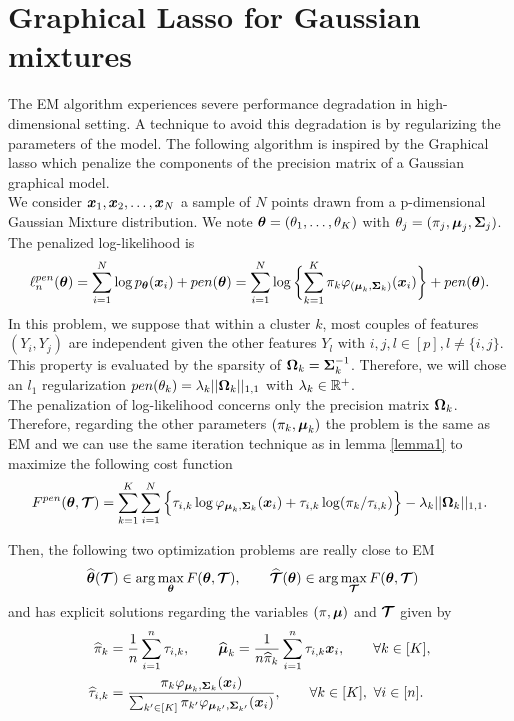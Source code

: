 \section{Graphical Lasso for Gaussian mixtures}

The EM algorithm experiences severe performance degradation in high-dimensional setting. A technique to avoid this degradation is by regularizing the parameters of the model. The following algorithm is inspired by the Graphical lasso \citep{glasso07} which penalize the components of the precision matrix of a Gaussian graphical model.\\

We consider $\boldsymbol x_1,\boldsymbol x_2,\dots,\boldsymbol x_N$ a sample of $N$ points drawn from a p-dimensional Gaussian Mixture distribution. We note ${\boldsymbol\theta}=(\theta_1,\dots,\theta_K)$ with $\theta_j=(\pi_j, \boldsymbol\mu_j, \boldsymbol\Sigma_j)$. The penalized log-likelihood is
\begin{equation}\label{pen-log-likelihood}
\ell_n^{pen}({\boldsymbol\theta})=\sum_{i=1}^{N}\log{p_{{\boldsymbol\theta}}(\boldsymbol x_i)}+pen({\boldsymbol\theta})=
\sum_{i=1}^{N}\log\bigg\{{\sum_{k=1}^K\pi_k\varphi_{(\boldsymbol\mu_{k},\boldsymbol\Sigma_{k})}(\boldsymbol x_i)}\bigg\} +pen({\boldsymbol\theta}) .
\end{equation}
In this problem, we suppose that within a cluster $k$, most couples of features $(Y_i,Y_j)$ are independent given the other features $Y_l \text{ with } i,j,l\in[p], l\neq\{i,j \}$. This property is evaluated by the sparsity of $\boldsymbol\Omega_k=\boldsymbol\Sigma_k^{-1}$. 
Therefore, we will chose an $l_1$ regularization $pen(\theta_k)=\lambda_k||\boldsymbol\Omega_k||_{1,1}$ with $\lambda_k\in{\mathbb R}^+$.\\

The penalization of log-likelihood concerns only the precision matrix $\boldsymbol\Omega_k$. Therefore, regarding the other parameters $(\pi_k, \boldsymbol\mu_k)$ the problem is the same as EM and we can use the same iteration technique as in lemma \ref{lemma1} to maximize the following cost function
\begin{equation}
\label{cost_fun_pen}
F^{pen}({\boldsymbol\theta},\boldsymbol{\mathcal T})  = \sum_{k=1}^K \sum_{i=1}^{N} \Big\{\tau_{i,k}\log\varphi_{\boldsymbol\mu_{k},\boldsymbol\Sigma_{k}}(\boldsymbol x_i)+\tau_{i,k}
    \log(\pi_k/\tau_{i,k})\Big\}-\lambda_k||\boldsymbol\Omega_k||_{1,1}.
\end{equation}

Then, the following two optimization problems are really close to EM
\begin{align}
\widehat{{\boldsymbol\theta}}(\boldsymbol{\mathcal T})&\in \arg\max_{{\boldsymbol\theta}} F({\boldsymbol\theta},\boldsymbol{\mathcal T}),\qquad \widehat{\boldsymbol{\mathcal T}}({\boldsymbol\theta})\in \arg\max_{\boldsymbol{\mathcal T}} F({\boldsymbol\theta},\boldsymbol{\mathcal T})
\end{align}
and has explicit solutions regarding the variables $(\pi,\boldsymbol\mu)$ and $\boldsymbol{\mathcal T}$ given by
\begin{align}
\label{em-sols}
\widehat\pi_k     &= \frac1n\sum_{i=1}^n \tau_{i,k},\qquad\widehat{\boldsymbol\mu}_k = \frac1{n\widehat\pi_k}\sum_{i=1}^n \tau_{i,k}\boldsymbol x_i ,\qquad \forall k\in[K],\\
\label{em-sols-tau}
\widehat\tau_{i,k}&= \frac{\pi_k\varphi_{\boldsymbol\mu_k,\boldsymbol\Sigma_k}(\boldsymbol x_i)}{\sum_{k'\in[K]}\pi_{k'}\varphi_{\boldsymbol\mu_{k'},\boldsymbol\Sigma_{k'}}(\boldsymbol x_i)},\qquad\forall k\in[K],\ \forall i\in[n].
\end{align}

